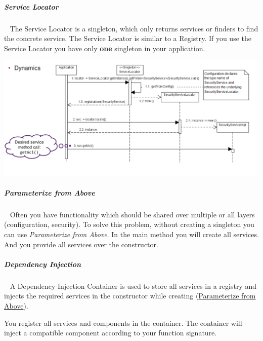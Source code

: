 \documentclass[8pt,twoside,landscape]{extarticle}
\begin{document}
\begin{multicols}{4}
\subparagraph{Service Locator} \
\label{sec:orgcd715d5}
The Service Locator is a singleton, which only returns services or finders to find the concrete service.
The Service Locator is similar to a Registry.
If you use the Service Locator you have only \textbf{one} singleton in your application.
{
\begin{center}
\includegraphics[width=.9\linewidth]{img/service_locator_dynamics.png}
\end{center}
\label{fig:service-locator-dynamics}
}
\subparagraph{Parameterize from Above} \
\label{sec:orgbaaa9d9}
Often you have functionality which should be shared over multiple or all layers (configuration, security).
To solve this problem, without creating a singleton you can use \emph{Parameterize from Above}.
In the main method you will create all services.
And you provide all services over the constructor.
\subparagraph{Dependency Injection} \
\label{sec:orgc646889}
A Dependency Injection Container is used to store all services in a registry and injects the required services in the constructor while creating (\href{../../../roam/20230125163949-how_to_share_classes_over_multiple_layers.org}{Parameterize from Above}).

You register all services and components in the container.
The container will inject a compatible component according to your function signature.


\end{multicols}
\end{document}
